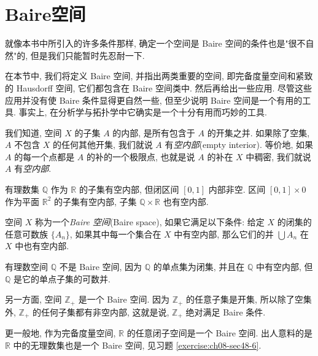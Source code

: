 ﻿\section{Baire空间}
\label{section:ch08-sec48}

就像本书中所引入的许多条件那样, 确定一个空间是 Baire 空间的条件也是"很不自然"的, 但是我们只能暂时先忍耐一下.

在本节中, 我们将定义 Baire 空间, 并指出两类重要的空间, 即完备度量空间和紧致的 Hausdorff 空间, 它们都包含在 Baire 空间类中. 然后再给出一些应用. 尽管这些应用并没有使 Baire 条件显得更自然一些, 但至少说明 Baire 空间是一个有用的工具. 事实上, 在分析学与拓扑学中它确实是一个十分有用而巧妙的工具.

\begin{definition}[空内部]
\label{definition:ch08-sec48-empty-interior}
我们知道, 空间 $X$ 的子集 $A$ 的内部, 是所有包含于 $A$ 的开集之并. 如果除了空集, $A$ 不包含 $X$ 的任何其他开集, 我们就说 $A$ 有\emph{空内部}(empty interior). 等价地, 如果 $A$ 的每一个点都是 $A$ 的补的一个极限点, 也就是说 $A$ 的补在 $X$ 中稠密, 我们就说 $A$ 有\emph{空内部}.
\end{definition}

\begin{example}
\label{example:ch08-sec48-1}
有理数集 $\mathbb{Q}$ 作为 $\mathbb{R}$ 的子集有空内部, 但闭区间 $[0,1]$ 内部非空. 区间 $[0,1]\times 0$ 作为平面 $\mathbb{R}^{2}$ 的子集有空内部, 子集 $\mathbb{Q}\times\mathbb{R}$ 也有空内部.
\end{example}

\begin{definition}[Baire空间]
\label{definition:ch08-sec48-baire}
空间 $X$ 称为一个\emph{Baire 空间}(Baire space), 如果它满足以下条件: 给定 $X$ 的闭集的任意可数族 $\{A_n\}$, 如果其中每一个集合在 $X$ 中有空内部, 那么它们的并 $\bigcup A_n$ 在 $X$ 中也有空内部.
\end{definition}

\begin{example}
\label{example:ch08-sec48-2}
有理数空间 $\mathbb{Q}$ 不是 Baire 空间, 因为 $\mathbb{Q}$ 的单点集为闭集, 并且在 $\mathbb{Q}$ 中有空内部, 但 $\mathbb{Q}$ 是它的单点子集的可数并.

另一方面, 空间 $\mathbb{Z}_{+}$ 是一个 Baire 空间. 因为 $\mathbb{Z}_{+}$ 的任意子集是开集, 所以除了空集外, $\mathbb{Z}_{+}$ 的任何子集都有非空内部, 这就是说, $\mathbb{Z}_{+}$ 绝对满足 Baire 条件.

更一般地, 作为完备度量空间, $\mathbb{R}$ 的任意闭子空间是一个 Baire 空间. 出人意料的是 $\mathbb{R}$ 中的无理数集也是一个 Baire 空间, 见习题 \cref{exercise:ch08-sec48-6}.
\end{example}


